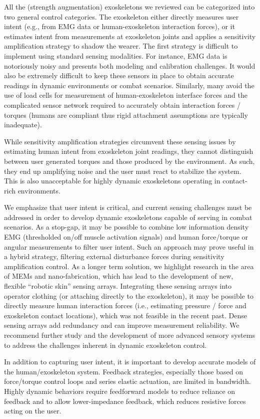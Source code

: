 \documentclass[letterpaper,12pt,fullpage]{article}
\begin{document}
All the (strength augmentation) exoskeletons we reviewed can be categorized into two general control categories.  The exoskeleton either directly measures user intent (e.g., from EMG data or human-exoskeleton interaction forces), or it estimates intent from measurements at exoskeleton joints and applies a sensitivity amplification strategy to shadow the wearer.  The first strategy is difficult to implement using standard sensing modalities.  For instance, EMG data is notoriously noisy and presents both modeling and calibration challenges.  It would also be extremely difficult to keep these sensors in place to obtain accurate readings in dynamic environments or combat scenarios.  Similarly, many avoid the use of load cells for measurement of human-exoskeleton interface forces and the complicated sensor network required to accurately obtain interaction forces / torques (humans are compliant thus rigid attachment assumptions are typically inadequate).

While sensitivity amplification strategies circumvent these sensing issues by estimating human intent from exoskeleton joint readings, they cannot distinguish between user generated torques and those produced by the environment.  As such, they end up amplifying noise and the user must react to stabilize the system.  This is also unacceptable for highly dynamic exoskeletons operating in contact-rich environments.

We emphasize that user intent is critical, and current sensing challenges must be addressed in order to develop dynamic exoskeletons capable of serving in combat scenarios.  As a stop-gap, it may be possible to combine low information density EMG (thresholded on/off muscle activation signals) and human force/torque or angular measurements to filter user intent.  Such an approach may prove useful in a hybrid strategy, filtering external disturbance forces during sensitivity amplification control.  As a longer term solution, we highlight research in the area of MEMs and nano-fabrication, which has lead to the development of new, flexible ``robotic skin'' sensing arrays.  Integrating these sensing arrays into operator clothing (or attaching directly to the exoskeleton), it may be possible to directly measure human interaction forces (i.e., estimating pressure / force and exoskeleton contact locations), which was not feasible in the recent past.  Dense sensing arrays add redundancy and can improve measurement reliability. We recommend further study and the development of more advanced sensory systems to address the challenges inherent in dynamic exoskeleton control.

In addition to capturing user intent, it is important to develop accurate models of the human/exoskeleton system.  Feedback strategies, especially those based on force/torque control loops and series elastic actuation, are limited in bandwidth. Highly dynamic behaviors require feedforward models to reduce reliance on feedback and to allow lower-impedance feedback, which reduces resistive forces acting on the user.


\end{document}

